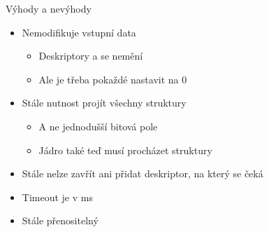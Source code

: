 \begin{frame}{Výhody a nevýhody }

  \begin{itemize}
    \item Nemodifikuje vstupní data
    \begin{itemize}
      \item Deskriptory a  se nemění
      \item Ale je třeba pokaždé nastavit  na 0
    \end{itemize}

    \pause

    \item Stále nutnost projít všechny struktury 
    \begin{itemize}
      \item A ne jednodušší bitová pole
      \item Jádro také teď musí procházet struktury
    \end{itemize}

    \pause

    \item Stále nelze zavřít ani přidat deskriptor, na který se čeká

    \pause

    \item Timeout je v ms
  \end{itemize}

  \pause

  \begin{itemize}
    \item Stále přenositelný
  \end{itemize}

\end{frame}

\ifpcdirlinuxb

